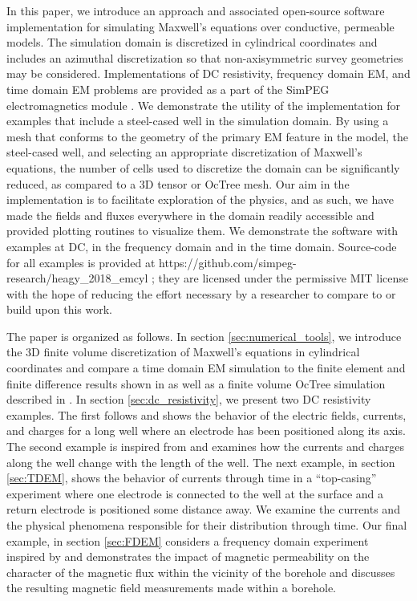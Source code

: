 In this paper, we introduce an approach and associated open-source software implementation for simulating Maxwell’s equations over conductive, permeable models. The simulation domain is discretized in cylindrical coordinates and includes an azimuthal discretization so that non-axisymmetric survey geometries may be considered. Implementations of DC resistivity, frequency domain EM, and time domain EM problems are provided as a part of the SimPEG electromagnetics module \citep{Cockett2015, Heagy2017}. We demonstrate the utility of the implementation for examples that include a steel-cased well in the simulation domain. By using a mesh that conforms to the geometry of the primary EM feature in the model, the steel-cased well, and selecting an appropriate discretization of Maxwell's equations, the number of cells used to discretize the domain can be significantly reduced, as compared to a 3D tensor or OcTree mesh. Our aim in the implementation is to facilitate exploration of the physics, and as such, we have made the fields and fluxes everywhere in the domain readily accessible and provided plotting routines to visualize them. We demonstrate the software with examples at DC, in the frequency domain and in the time domain. Source-code for all examples is provided at https://github.com/simpeg-research/heagy\_2018\_emcyl \citep{Heagy2018}; they are licensed under the permissive MIT license with the hope of reducing the effort necessary by a researcher to compare to or build upon this work.

The paper is organized as follows. In section \ref{sec:numerical_tools}, we introduce the 3D finite volume discretization of Maxwell's equations in cylindrical coordinates and compare a time domain EM simulation to the finite element and finite difference results shown in \citep{Commer2015} as well as a finite volume OcTree simulation described in \citep{Haber2007}. In section \ref{sec:dc_resistivity}, we present two DC resistivity examples. The first follows \citep{Kaufman1990} and shows the behavior of the electric fields, currents, and charges for a long well where an electrode has been positioned along its axis. The second example is inspired from \citep{Kaufman1993} and examines how the currents and charges along the well change with the length of the well. The next example, in section \ref{sec:TDEM}, shows the behavior of currents through time in a ``top-casing'' experiment where one electrode is connected to the well at the surface and a return electrode is positioned some distance away. We examine the currents and the physical phenomena responsible for their distribution through time. Our final example, in section \ref{sec:FDEM} considers a frequency domain experiment inspired by \citep{Augustin1989} and demonstrates the impact of magnetic permeability on the character of the magnetic flux within the vicinity of the borehole and discusses the resulting magnetic field measurements made within a borehole.



